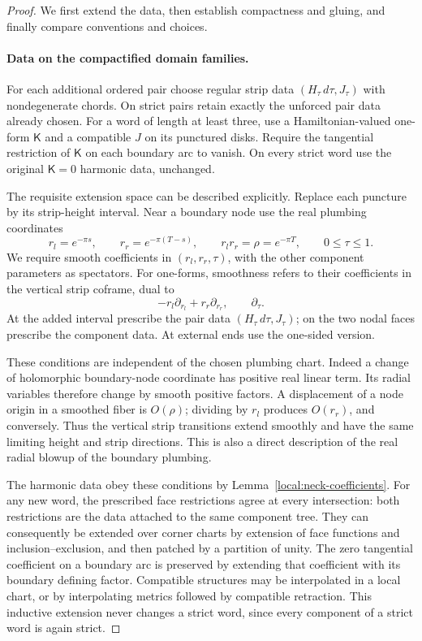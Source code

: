 \begin{proof}
We first extend the data, then establish compactness and gluing, and
finally compare conventions and choices.

\paragraph{Data on the compactified domain families.}
For each additional ordered pair choose regular strip data
\((H_\tau\,d\tau,J_\tau)\) with nondegenerate chords.  On strict pairs
retain exactly the unforced pair data already chosen.
For a word of length at least three, use a Hamiltonian-valued one-form
\(\mathsf K\) and a compatible \(J\) on its punctured disks.
Require the tangential restriction of \(\mathsf K\) on each boundary arc
to vanish.  On every strict word use the original \(\mathsf K=0\)
harmonic data, unchanged.

The requisite extension space can be described explicitly.
Replace each puncture by its strip-height interval.  Near a boundary
node use the real plumbing coordinates
\[
 r_l=e^{-\pi s},\qquad r_r=e^{-\pi(T-s)},\qquad
 r_l r_r=\rho=e^{-\pi T},\qquad 0\le\tau\le1.
\]
We require smooth coefficients in
\((r_l,r_r,\tau)\), with the other component parameters as spectators.
For one-forms, smoothness refers to their coefficients in the vertical
strip coframe, dual to
\[
 -r_l\partial_{r_l}+r_r\partial_{r_r},
 \qquad \partial_\tau.
\]
At the added interval prescribe the pair data
\((H_\tau\,d\tau,J_\tau)\); on the two nodal faces prescribe the
component data.  At external ends use the one-sided version.

These conditions are independent of the chosen plumbing chart.
Indeed a change of holomorphic boundary-node coordinate has positive
real linear term.  Its radial variables therefore change by smooth
positive factors.  A displacement of a node origin in a smoothed fiber
is \(O(\rho)\); dividing by \(r_l\) produces \(O(r_r)\), and conversely.
Thus the vertical strip transitions extend smoothly and have the same
limiting height and strip directions.  This is also a direct description
of the real radial blowup of the boundary plumbing.

The harmonic data obey these conditions by
Lemma~\ref{local:neck-coefficients}.
For any new word, the prescribed face restrictions agree at every
intersection: both restrictions are the data attached to the same
component tree.  They can consequently be extended over corner charts
by extension of face functions and inclusion--exclusion, and then
patched by a partition of unity.  The zero tangential coefficient on a
boundary arc is preserved by extending that coefficient with its
boundary defining factor.  Compatible structures may be interpolated
in a local chart, or by interpolating metrics followed by compatible
retraction.  This inductive extension never changes a strict word,
since every component of a strict word is again strict.


\end{proof}
